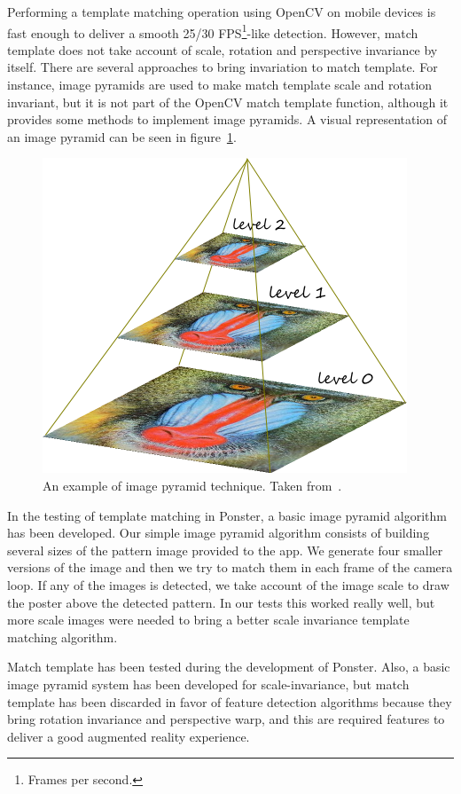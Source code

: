 Performing a template matching operation using OpenCV on mobile devices is fast
enough to deliver a smooth 25/30 FPS\footnote{Frames per second.}-like
detection. However, match template does not 
take account of scale, rotation and perspective invariance by itself. There are
several approaches to bring invariation to match template. For instance, image
pyramids are used to make match template scale and rotation
invariant\cite{4368176}, but it is not part of the OpenCV match template function, although it
provides some methods to implement image pyramids\cite{ocv02}. A visual
representation of an image pyramid can be seen in figure~\ref{fig:pyramid}. 

\begin{figure}
\centering
\includegraphics[scale=0.55]{img/pyramid.png}
\caption{\label{fig:pyramid}An example of image pyramid technique. Taken
  from~\cite{imgpyramid}.} 
\end{figure} 

In the testing of template matching in Ponster, a basic image pyramid algorithm
has been developed. Our simple image pyramid algorithm consists of building
several sizes of the pattern image provided to the app. We generate four
smaller versions of the image and then we try to match them in each frame of
the camera loop. If any of the images is detected, we take account of the
image scale to draw the poster above the detected pattern. In our tests this
worked really well, but more scale images were needed to bring a better scale
invariance template matching algorithm.

Match template has been tested during the development of Ponster. Also, a basic
image pyramid system has been developed for scale-invariance, but match template has
been discarded in favor of feature detection algorithms because they bring rotation
 invariance and perspective warp, and this are required features to deliver a
 good augmented reality experience.

